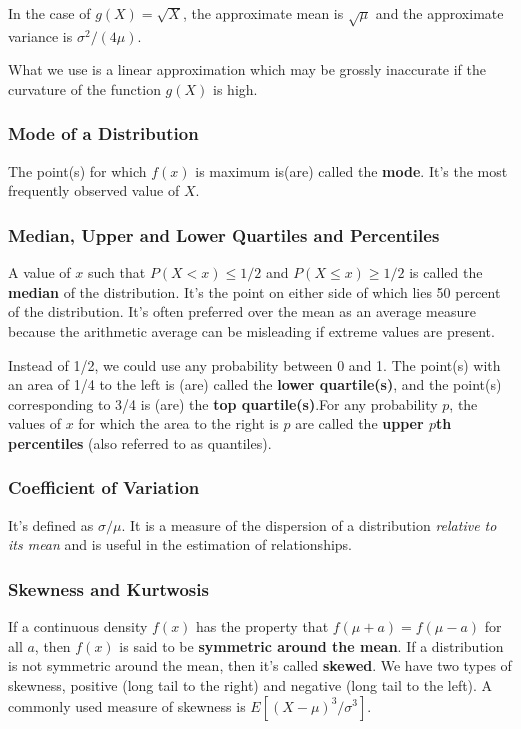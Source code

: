 \documentclass{article}
\begin{document}
In the case of \(g(X)=\sqrt{X}\), the approximate mean is \(\sqrt{\mu}\) and the approximate variance is \(\sigma^2/(4\mu)\). 

What we use is a linear approximation which may be grossly inaccurate if the curvature of the function \(g(X)\) is high.

\subsubsection{Mode of a Distribution}

The point(s) for which \(f(x)\) is maximum is(are) called the \textbf{mode}. It's the most frequently observed value of \(X\).

\subsubsection{Median, Upper and Lower Quartiles and Percentiles}

A value of \(x\) such that \(P(X<x) \leq 1/2\) and \(P(X \leq x) \geq 1/2\) is called the \textbf{median} of the distribution. It's the point on either side of which lies 50 percent of the distribution. It's often preferred over the mean as an average measure because the arithmetic average can be misleading if extreme values are present.

Instead of 1/2, we could use any probability between 0 and 1. The point(s) with an area of 1/4 to the left is (are) called the \textbf{lower quartile(s)}, and the point(s) corresponding to 3/4 is (are) the \textbf{top quartile(s)}.For any probability \(p\), the values of \(x\) for which the area to the right is \(p\) are called the \textbf{upper \(p\)th percentiles} (also referred to as quantiles).

\subsubsection{Coefficient of Variation}

It's defined as \(\sigma/\mu\). It is a measure of the dispersion of a distribution \textit{relative to its mean} and is useful in the estimation of relationships. 

\subsubsection{Skewness and Kurtwosis}

If a continuous density \(f(x)\) has the property that \(f(\mu+a)=f(\mu-a)\) for all \(a\), then \(f(x)\) is said to be \textbf{symmetric around the mean}. If a distribution is not symmetric around the mean, then it's called \textbf{skewed}. We have two types of skewness, positive (long tail  to the right) and negative (long tail to the left). A commonly used measure of skewness is \(E[(X-\mu)^3/\sigma^3]\).
\end{document}
